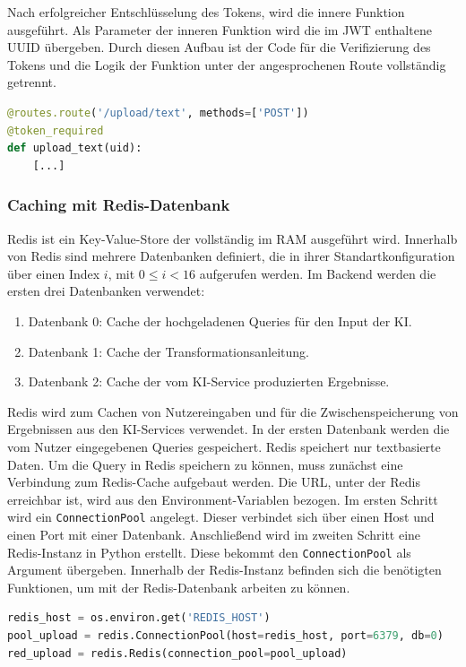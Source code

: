 Nach erfolgreicher Entschlüsselung des Tokens, wird die innere Funktion ausgeführt. Als Parameter der inneren Funktion wird die im JWT enthaltene UUID übergeben. Durch diesen Aufbau ist der Code für die Verifizierung des Tokens und die Logik der Funktion unter der angesprochenen Route vollständig getrennt.

\begin{lstlisting}[language=Python, caption={Route zum Upload von Queries mit Nutzung des JWTs}]
@routes.route('/upload/text', methods=['POST'])
@token_required
def upload_text(uid):
    [...]
\end{lstlisting}

\subsubsection{Caching mit Redis-Datenbank}
Redis ist ein Key-Value-Store der vollständig im RAM ausgeführt wird. Innerhalb von Redis sind mehrere Datenbanken definiert, die in ihrer Standartkonfiguration über einen Index $i$, mit $0\leq{}i<16$ aufgerufen werden. Im Backend werden die ersten drei Datenbanken verwendet:
\begin{enumerate}
 \item Datenbank 0: Cache der hochgeladenen Queries für den Input der KI.
 \item Datenbank 1: Cache der Transformationsanleitung.
 \item Datenbank 2: Cache der vom KI-Service produzierten Ergebnisse.
\end{enumerate} 

Redis wird zum Cachen von Nutzereingaben und für die Zwischenspeicherung von Ergebnissen aus den KI-Services verwendet. In der ersten Datenbank werden die vom Nutzer eingegebenen Queries gespeichert. Redis speichert nur textbasierte Daten. Um die Query in Redis speichern zu können, muss zunächst eine Verbindung zum Redis-Cache aufgebaut werden. Die URL, unter der Redis erreichbar ist, wird aus den Environment-Variablen bezogen. Im ersten Schritt wird ein \texttt{ConnectionPool} angelegt. Dieser verbindet sich über einen Host und einen Port mit einer Datenbank. Anschließend wird im zweiten Schritt eine Redis-Instanz in Python erstellt. Diese bekommt den \texttt{ConnectionPool} als Argument übergeben. Innerhalb der Redis-Instanz befinden sich die benötigten Funktionen, um mit der Redis-Datenbank arbeiten zu können.

\begin{lstlisting}[language=Python, caption={Aufsetzen der Redis-Verbindung}]
redis_host = os.environ.get('REDIS_HOST')
pool_upload = redis.ConnectionPool(host=redis_host, port=6379, db=0)
red_upload = redis.Redis(connection_pool=pool_upload)
\end{lstlisting}

